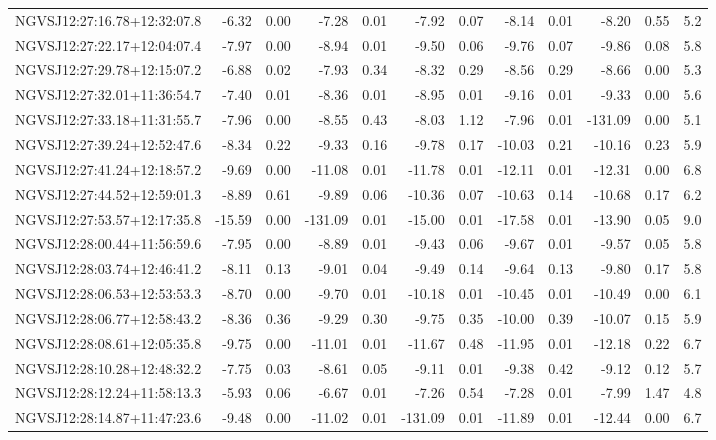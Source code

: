 \begin{tabular}{lrrrrrrrrrrc}
NGVSJ12:27:16.78+12:32:07.8 & -6.32 & 0.00 & -7.28 & 0.01 & -7.92 & 0.07 & -8.14 & 0.01 & -8.20 & 0.55 & 5.2 \\
NGVSJ12:27:22.17+12:04:07.4 & -7.97 & 0.00 & -8.94 & 0.01 & -9.50 & 0.06 & -9.76 & 0.07 & -9.86 & 0.08 & 5.8 \\
NGVSJ12:27:29.78+12:15:07.2 & -6.88 & 0.02 & -7.93 & 0.34 & -8.32 & 0.29 & -8.56 & 0.29 & -8.66 & 0.00 & 5.3 \\
NGVSJ12:27:32.01+11:36:54.7 & -7.40 & 0.01 & -8.36 & 0.01 & -8.95 & 0.01 & -9.16 & 0.01 & -9.33 & 0.00 & 5.6 \\
NGVSJ12:27:33.18+11:31:55.7 & -7.96 & 0.00 & -8.55 & 0.43 & -8.03 & 1.12 & -7.96 & 0.01 & -131.09 & 0.00 & 5.1 \\
NGVSJ12:27:39.24+12:52:47.6 & -8.34 & 0.22 & -9.33 & 0.16 & -9.78 & 0.17 & -10.03 & 0.21 & -10.16 & 0.23 & 5.9 \\
NGVSJ12:27:41.24+12:18:57.2 & -9.69 & 0.00 & -11.08 & 0.01 & -11.78 & 0.01 & -12.11 & 0.01 & -12.31 & 0.00 & 6.8 \\
NGVSJ12:27:44.52+12:59:01.3 & -8.89 & 0.61 & -9.89 & 0.06 & -10.36 & 0.07 & -10.63 & 0.14 & -10.68 & 0.17 & 6.2 \\
NGVSJ12:27:53.57+12:17:35.8 & -15.59 & 0.00 & -131.09 & 0.01 & -15.00 & 0.01 & -17.58 & 0.01 & -13.90 & 0.05 & 9.0 \\
NGVSJ12:28:00.44+11:56:59.6 & -7.95 & 0.00 & -8.89 & 0.01 & -9.43 & 0.06 & -9.67 & 0.01 & -9.57 & 0.05 & 5.8 \\
NGVSJ12:28:03.74+12:46:41.2 & -8.11 & 0.13 & -9.01 & 0.04 & -9.49 & 0.14 & -9.64 & 0.13 & -9.80 & 0.17 & 5.8 \\
NGVSJ12:28:06.53+12:53:53.3 & -8.70 & 0.00 & -9.70 & 0.01 & -10.18 & 0.01 & -10.45 & 0.01 & -10.49 & 0.00 & 6.1 \\
NGVSJ12:28:06.77+12:58:43.2 & -8.36 & 0.36 & -9.29 & 0.30 & -9.75 & 0.35 & -10.00 & 0.39 & -10.07 & 0.15 & 5.9 \\
NGVSJ12:28:08.61+12:05:35.8 & -9.75 & 0.00 & -11.01 & 0.01 & -11.67 & 0.48 & -11.95 & 0.01 & -12.18 & 0.22 & 6.7 \\
NGVSJ12:28:10.28+12:48:32.2 & -7.75 & 0.03 & -8.61 & 0.05 & -9.11 & 0.01 & -9.38 & 0.42 & -9.12 & 0.12 & 5.7 \\
NGVSJ12:28:12.24+11:58:13.3 & -5.93 & 0.06 & -6.67 & 0.01 & -7.26 & 0.54 & -7.28 & 0.01 & -7.99 & 1.47 & 4.8 \\
NGVSJ12:28:14.87+11:47:23.6 & -9.48 & 0.00 & -11.02 & 0.01 & -131.09 & 0.01 & -11.89 & 0.01 & -12.44 & 0.00 & 6.7 \\

\end{tabular}
